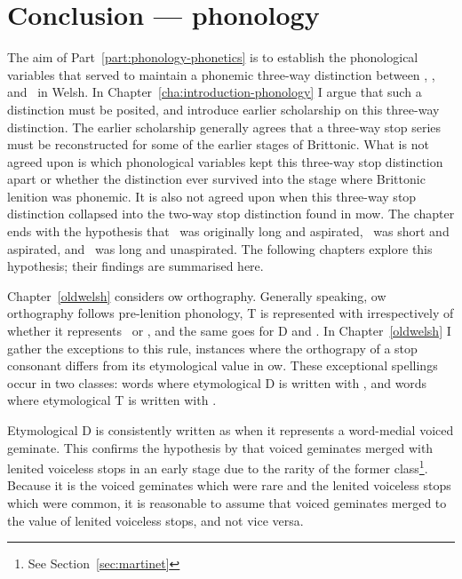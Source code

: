 \chapter{Conclusion --- phonology}
\label{cha:conclusion-phonology}

The aim of Part~\ref{part:phonology-phonetics} is to establish the phonological variables that served to maintain a phonemic three-way distinction between \xT, \lT, and \xD\ in Welsh. In Chapter~\ref{cha:introduction-phonology} I argue that such a distinction must be posited, and introduce earlier scholarship on this three-way distinction. The earlier scholarship generally agrees that a three-way stop series must be reconstructed for some of the earlier stages of Brittonic. What is not agreed upon is which phonological variables kept this three-way stop distinction apart or whether the distinction ever survived into the stage where Brittonic lenition was phonemic. It is also not agreed upon when this three-way stop distinction collapsed into the two-way stop distinction found in \gls{mow}. The chapter ends with the hypothesis that \xT\ was originally long and aspirated, \lT\ was short and aspirated, and \xD\ was long and unaspirated. The following chapters explore this hypothesis; their findings are summarised here.

Chapter~\ref{oldwelsh} considers \gls{ow} orthography. Generally speaking, \gls{ow} orthography follows pre-lenition phonology, \ie \gls{T} is represented with  irrespectively of whether it represents \lT\ or \xT, and the same goes for \gls{D} and . In Chapter~\ref{oldwelsh} I gather the exceptions to this rule, \ie instances where the orthograpy of a stop consonant differs from its etymological value in \gls{ow}. These exceptional spellings occur in two classes: words where etymological  \gls{D} is written with , and words where etymological \gls{T} is written with .

Etymological \gls{D} is consistently written as  when it represents a word-medial voiced geminate. This confirms the hypothesis by \textcite{martinet_celtic_1952} that voiced geminates merged with lenited voiceless stops in an early stage due to the rarity of the former class\footnote{See Section~\ref{sec:martinet}}. Because it is the voiced geminates which were rare and the lenited voiceless stops which were common, it is reasonable to assume that voiced geminates merged to the value of lenited voiceless stops, and not vice versa.

